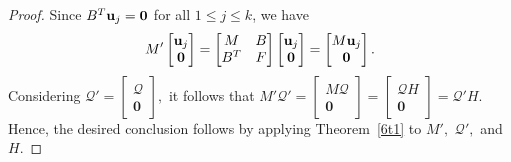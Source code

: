 \documentclass[10pt,a4paper]{amsart}
\def \u {{\bf u}}
\begin{document}
\begin{proof}
Since $B^T\u_j=\mathbf{0}$ for all $1\leq j\leq k$, we have
\[
M'\begin{bmatrix}
\u_j\\
\mathbf{0}
\end{bmatrix}=
\begin{bmatrix}
M & B\\
B^T & F
\end{bmatrix}
\begin{bmatrix}
\u_j\\
\mathbf{0}
\end{bmatrix}
=
\begin{bmatrix}
M\u_j\\
\mathbf{0}
\end{bmatrix}.
\]
Considering $\mathcal{Q'}=\begin{bmatrix}
    \mathcal{Q}\\ \mathbf{0}
\end{bmatrix},$ it follows that
$
M'\mathcal{Q'}=
\begin{bmatrix}
M\mathcal{Q}\\
\mathbf{0}
\end{bmatrix}
=
\begin{bmatrix}
\mathcal{Q}H\\
\mathbf{0}
\end{bmatrix}
=\mathcal{Q'}H.$
Hence, the desired conclusion follows by applying Theorem~\ref{6t1} to $M',$ $\mathcal{Q'},$ and $H.$ 
\end{proof}
\end{document}
